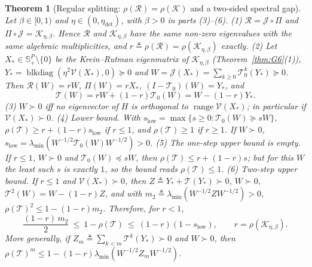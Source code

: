 \documentclass[11pt]{article}
\newtheorem{theorem}{Theorem}
\theoremstyle{remark}
\begin{document}
\begin{theorem}[Regular splitting: $\rho(\mathcal R)=\rho(\mathcal K)$ and a two-sided spectral gap]\label{thm:splitting}
Let $\beta\in[0,1)$ and $\eta\in(0,\eta_{\mathrm{det}})$, with $\beta>0$ in parts (3)--(6).
(1) $\mathcal R=\mathcal J\circ\Pi$ and $\Pi\circ\mathcal J=\mathcal K_{\eta,\beta}$. Hence $\mathcal R$ and $\mathcal K_{\eta,\beta}$ have the same non-zero eigenvalues with the same algebraic multiplicities, and $r\triangleq\rho(\mathcal R)=\rho(\mathcal K_{\eta,\beta})$ exactly.
(2) Let $X_*\in\mathbb S^P_+\setminus\{0\}$ be the Krein--Rutman eigenmatrix of $\mathcal K_{\eta,\beta}$ (Theorem~\ref{thm:G6}(1)), $Y_*=\operatorname{blkdiag}(\eta^2\mathcal V(X_*),0)\succeq0$ and $W=\mathcal J(X_*)=\sum_{k\ge0}\mathcal T_0^k(Y_*)\succeq0$. Then $\mathcal R(W)=rW$, $\Pi(W)=rX_*$, $(I-\mathcal T_0)(W)=Y_*$, and
\begin{equation}\label{eq:split-identity}
\mathcal T(W)=rW+(1-r)\mathcal T_0(W)=W-(1-r)Y_* .
\end{equation}
(3) $W\succ0$ iff no eigenvector of $H$ is orthogonal to $\operatorname{range}\mathcal V(X_*)$; in particular if $\mathcal V(X_*)\succ0$.
(4) Lower bound. With $s_{\mathrm{low}}=\max\{s\ge0:\mathcal T_0(W)\succeq sW\}$, $\rho(\mathcal T)\ge r+(1-r)s_{\mathrm{low}}$ if $r\le1$, and $\rho(\mathcal T)\ge1$ if $r\ge1$. If $W\succ0$, $s_{\mathrm{low}}=\lambda_{\min}(W^{-1/2}\mathcal T_0(W)W^{-1/2})>0$.
(5) The one-step upper bound is empty. If $r\le1$, $W\succ0$ and $\mathcal T_0(W)\preceq sW$, then $\rho(\mathcal T)\le r+(1-r)s$; but for this $W$ the least such $s$ is exactly $1$, so the bound reads $\rho(\mathcal T)\le1$.
(6) Two-step upper bound. If $r\le1$ and $\mathcal V(X_*)\succ0$, then $Z\triangleq Y_*+\mathcal T(Y_*)\succ0$, $W\succ0$, $\mathcal T^2(W)=W-(1-r)Z$, and with $m_2\triangleq\lambda_{\min}(W^{-1/2}ZW^{-1/2})>0$, $\rho(\mathcal T)^2\le1-(1-r)m_2$. Therefore, for $r<1$,
\[
\frac{(1-r)\,m_2}{2}\ \le\ 1-\rho(\mathcal T)\ \le\ (1-r)(1-s_{\mathrm{low}}),\qquad r=\rho(\mathcal K_{\eta,\beta}).
\]
More generally, if $Z_m\triangleq\sum_{k<m}\mathcal T^k(Y_*)\succ0$ and $W\succ0$, then $\rho(\mathcal T)^m\le1-(1-r)\lambda_{\min}(W^{-1/2}Z_mW^{-1/2})$.
\end{theorem}
\end{document}

